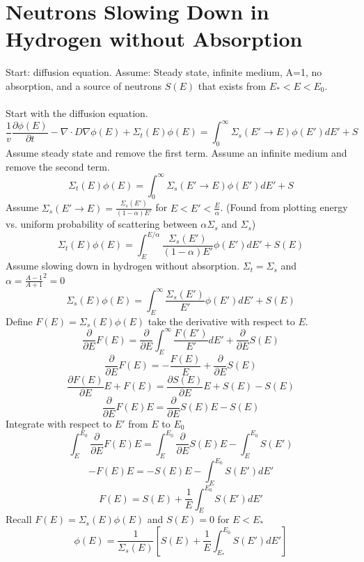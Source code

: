 \documentclass[]{article}
\begin{document}
		\section*{\textbf{Neutrons Slowing Down in Hydrogen without Absorption}}
		Start: diffusion equation. Assume: Steady state, infinite medium, A=1, no absorption, and a source of neutrons $S(E)$ that exists from $E_* <E<E_0$.\\\\
		Start with the diffusion equation. 
		\[
		\frac{1}{v}\frac{\partial \phi(E)}{\partial t} - \nabla \cdot D\nabla\phi(E) + \Sigma_t(E)\phi(E) = \int_{0}^{\infty}\Sigma_s(E'\rightarrow E)\phi(E')dE'+ S
		\]
		Assume steady state and remove the first term. Assume an infinite medium and remove the second term. 
		\[
		\Sigma_t(E)\phi(E) = \int_{0}^{\infty}\Sigma_s(E'\rightarrow E)\phi(E')dE'+ S
		\]
		Assume $\Sigma_s(E'\rightarrow E) = \frac{\Sigma_s(E')}{(1-\alpha)E'}$ for $E<E'<\frac{E}{\alpha}$. (Found from plotting energy vs. uniform probability of scattering between $\alpha\Sigma_s$ and $\Sigma_s$)
		\[
		\Sigma_t(E)\phi(E) = \int_{E}^{E/\alpha}\frac{\Sigma_s(E')}{(1-\alpha)E'}\phi(E')dE'+ S(E)
		\]
		Assume slowing down in hydrogen without absorption. $\Sigma_t = \Sigma_s$ and $\alpha = \frac{A-1}{A+1}^2 = 0$
		\[
		\Sigma_s(E)\phi(E) = \int_{E}^{\infty}\frac{\Sigma_s(E')}{E'}\phi(E')dE'+ S(E)
		\]
		Define $F(E)=\Sigma_s(E)\phi(E)$ take the derivative with respect to $E$.
		\[
		\frac{\partial}{\partial E}F(E) = \frac{\partial}{\partial E}\int_{E}^{\infty}\frac{F(E')}{E'}dE'+ \frac{\partial}{\partial E}S(E)
		\]
		\[
		\frac{\partial}{\partial E}F(E) =-\frac{F(E)}{E}+ \frac{\partial}{\partial E}S(E)
		\]
		\[
		\frac{\partial F(E)}{\partial E}E+F(E) = \frac{\partial S(E)}{\partial E}E + S(E) - S(E)
		\]
		\[
		\frac{\partial}{\partial E}F(E)E = \frac{\partial}{\partial E}S(E)E - S(E)
		\]
		Integrate with respect to $E'$ from $E$ to $E_0$
		\[
		\int_{E}^{E_0}\frac{\partial}{\partial E}F(E)E = \int_{E}^{E_0}\frac{\partial}{\partial E}S(E)E - \int_{E}^{E_0}S(E')
		\]
		\[
		-F(E)E = -S(E)E - \int_{E}^{E_0}S(E')dE'
		\]  
		\[
		F(E) = S(E) + \frac{1}{E}\int_{E}^{E_0}S(E')dE'
		\]
		Recall $F(E) = \Sigma_s(E)\phi(E)$ and $S(E) = 0$ for $E<E_*$
		\[
		\phi(E) = \frac{1}{\Sigma_s(E)}\left[S(E) + \frac{1}{E}\int_{E_*}^{E_0}S(E')dE'\right]
		\]
		
		
\end{document}
